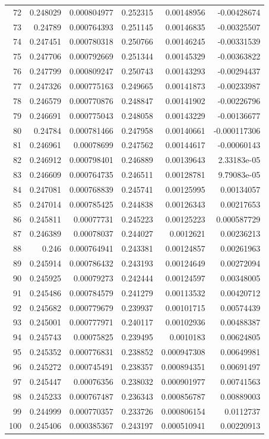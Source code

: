 \documentclass[10pt]{article}
\begin{document}
\begin{longtable}{rrrrrr}
72 & 0.248029 & 0.000804977 & 0.252315 & 0.00148956 & -0.00428674 \\
73 & 0.24789 & 0.000764393 & 0.251145 & 0.00146835 & -0.00325507 \\
74 & 0.247451 & 0.000780318 & 0.250766 & 0.00146245 & -0.00331539 \\
75 & 0.247706 & 0.000792669 & 0.251344 & 0.00145329 & -0.00363822 \\
76 & 0.247799 & 0.000809247 & 0.250743 & 0.00143293 & -0.00294437 \\
77 & 0.247326 & 0.000775163 & 0.249665 & 0.00141873 & -0.00233987 \\
78 & 0.246579 & 0.000770876 & 0.248847 & 0.00141902 & -0.00226796 \\
79 & 0.246691 & 0.000775043 & 0.248058 & 0.00143229 & -0.00136677 \\
80 & 0.24784 & 0.000781466 & 0.247958 & 0.00140661 & -0.000117306 \\
81 & 0.246961 & 0.00078699 & 0.247562 & 0.00144617 & -0.00060143 \\
82 & 0.246912 & 0.000798401 & 0.246889 & 0.00139643 & 2.33183e-05 \\
83 & 0.246609 & 0.000764735 & 0.246511 & 0.00128781 & 9.79083e-05 \\
84 & 0.247081 & 0.000768839 & 0.245741 & 0.00125995 & 0.00134057 \\
85 & 0.247014 & 0.000785425 & 0.244838 & 0.00126343 & 0.00217653 \\
86 & 0.245811 & 0.00077731 & 0.245223 & 0.00125223 & 0.000587729 \\
87 & 0.246389 & 0.00078037 & 0.244027 & 0.0012621 & 0.00236213 \\
88 & 0.246 & 0.000764941 & 0.243381 & 0.00124857 & 0.00261963 \\
89 & 0.245914 & 0.000786432 & 0.243193 & 0.00124649 & 0.00272094 \\
90 & 0.245925 & 0.00079273 & 0.242444 & 0.00124597 & 0.00348005 \\
91 & 0.245486 & 0.000784579 & 0.241279 & 0.00113532 & 0.00420712 \\
92 & 0.245682 & 0.000779679 & 0.239937 & 0.00101715 & 0.00574439 \\
93 & 0.245001 & 0.000777971 & 0.240117 & 0.00102936 & 0.00488387 \\
94 & 0.245743 & 0.00075825 & 0.239495 & 0.0010183 & 0.00624805 \\
95 & 0.245352 & 0.000776831 & 0.238852 & 0.000947308 & 0.00649981 \\
96 & 0.245272 & 0.000745491 & 0.238357 & 0.000894351 & 0.00691497 \\
97 & 0.245447 & 0.00076356 & 0.238032 & 0.000901977 & 0.00741563 \\
98 & 0.245233 & 0.000767487 & 0.236343 & 0.000856787 & 0.00889003 \\
99 & 0.244999 & 0.000770357 & 0.233726 & 0.000806154 & 0.0112737 \\
100 & 0.245406 & 0.000385367 & 0.243197 & 0.000510941 & 0.00220913 \\
\bottomrule
\end{longtable}
\end{document}
